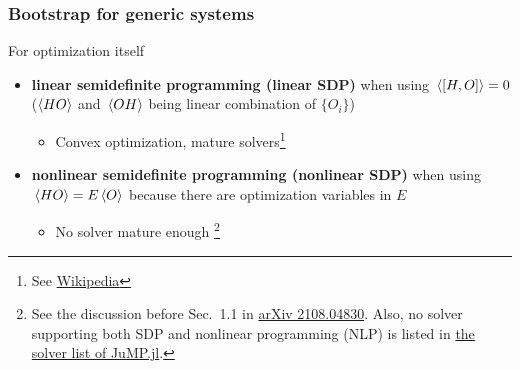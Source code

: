 \documentclass{beamer}
\newcommand{\concept}[1]{\textbf{#1}}
\begin{document}
\begin{frame}
\frametitle{Bootstrap for generic systems}

For optimization itself
\begin{itemize}
    \item \concept{linear semidefinite programming (linear SDP)} when using $\expval*{\comm{H}{O}} = 0$
    ($\expval{HO}$ and $\expval*{OH}$ being linear combination of $\{O_i\}$)
    \begin{itemize}
        \item Convex optimization, mature solvers\footnote{See \href{https://en.wikipedia.org/wiki/Semidefinite_programming}{Wikipedia}} 
    \end{itemize}
    \item \concept{nonlinear semidefinite programming (nonlinear SDP)} when using $\expval*{{H}{O}} = E \expval*{O}$
    because there are optimization variables in $E$
    \begin{itemize}
        \item No solver mature enough \footnote{See the discussion before Sec.~1.1 in \href{https://arxiv.org/abs/2108.04830}{arXiv 2108.04830}. Also, no solver supporting both SDP and nonlinear programming (NLP) is listed in \href{https://jump.dev/JuMP.jl/stable/installation/}{the solver list of JuMP.jl}.}
    \end{itemize}
\end{itemize}    

\end{frame}
\end{document}

